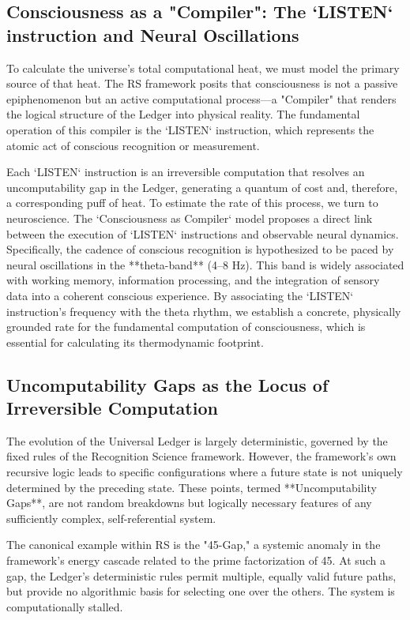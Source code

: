 \documentclass[11pt,a4paper]{article}
\theoremstyle{definition}
\theoremstyle{remark}
\begin{document}
\subsection{Consciousness as a "Compiler": The `LISTEN` instruction and Neural Oscillations}

To calculate the universe's total computational heat, we must model the primary source of that heat. The RS framework posits that consciousness is not a passive epiphenomenon but an active computational process—a "Compiler" that renders the logical structure of the Ledger into physical reality. The fundamental operation of this compiler is the `LISTEN` instruction, which represents the atomic act of conscious recognition or measurement.

Each `LISTEN` instruction is an irreversible computation that resolves an uncomputability gap in the Ledger, generating a quantum of cost and, therefore, a corresponding puff of heat. To estimate the rate of this process, we turn to neuroscience. The `Consciousness as Compiler` model proposes a direct link between the execution of `LISTEN` instructions and observable neural dynamics. Specifically, the cadence of conscious recognition is hypothesized to be paced by neural oscillations in the **theta-band** (4–8 Hz). This band is widely associated with working memory, information processing, and the integration of sensory data into a coherent conscious experience. By associating the `LISTEN` instruction's frequency with the theta rhythm, we establish a concrete, physically grounded rate for the fundamental computation of consciousness, which is essential for calculating its thermodynamic footprint.

\subsection{Uncomputability Gaps as the Locus of Irreversible Computation}

The evolution of the Universal Ledger is largely deterministic, governed by the fixed rules of the Recognition Science framework. However, the framework's own recursive logic leads to specific configurations where a future state is not uniquely determined by the preceding state. These points, termed **Uncomputability Gaps**, are not random breakdowns but logically necessary features of any sufficiently complex, self-referential system.

The canonical example within RS is the "45-Gap," a systemic anomaly in the framework's energy cascade related to the prime factorization of 45. At such a gap, the Ledger's deterministic rules permit multiple, equally valid future paths, but provide no algorithmic basis for selecting one over the others. The system is computationally stalled.
\end{document}
